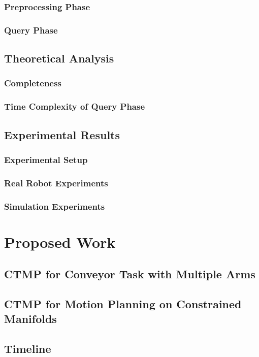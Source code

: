 \documentclass[a4paper,10pt]{article}
\begin{document}
\subsubsection{Preprocessing Phase}
\subsubsection{Query Phase}
\subsection{Theoretical Analysis}
\subsubsection{Completeness}
\subsubsection{Time Complexity of Query Phase}
\subsection{Experimental Results}
\subsubsection{Experimental Setup}
\subsubsection{Real Robot Experiments}
\subsubsection{Simulation Experiments}

\section{Proposed Work}
\subsection{CTMP for Conveyor Task with Multiple Arms}
\subsection{CTMP for Motion Planning on Constrained Manifolds}
\subsection{Timeline}




\newpage



\end{document}
